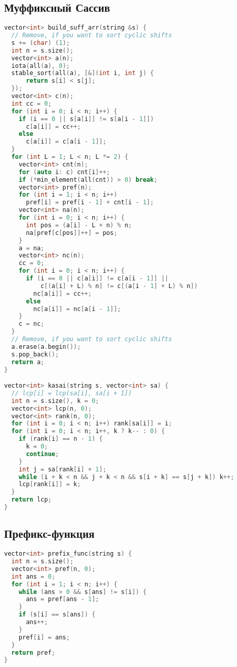 \documentclass[9pt,a4paper,landscape,twosided]{extarticle}
\begin{document}
\begin{multicols*}{3}
\subsection{Муффиксный Сассив}
\begin{lstlisting}[language=C++]
vector<int> build_suff_arr(string &s) {
  // Remove, if you want to sort cyclic shifts
  s += (char) (1);
  int n = s.size();
  vector<int> a(n);
  iota(all(a), 0);
  stable_sort(all(a), [&](int i, int j) {
      return s[i] < s[j];
  });
  vector<int> c(n);
  int cc = 0;
  for (int i = 0; i < n; i++) {
    if (i == 0 || s[a[i]] != s[a[i - 1]])
      c[a[i]] = cc++;
    else
      c[a[i]] = c[a[i - 1]];
  }
  for (int L = 1; L < n; L *= 2) {
    vector<int> cnt(n);
    for (auto i: c) cnt[i]++;
    if (*min_element(all(cnt)) > 0) break;
    vector<int> pref(n);
    for (int i = 1; i < n; i++)
      pref[i] = pref[i - 1] + cnt[i - 1];
    vector<int> na(n);
    for (int i = 0; i < n; i++) {
      int pos = (a[i] - L + n) % n;
      na[pref[c[pos]]++] = pos;
    }
    a = na;
    vector<int> nc(n);
    cc = 0;
    for (int i = 0; i < n; i++) {
      if (i == 0 || c[a[i]] != c[a[i - 1]] ||
          c[(a[i] + L) % n] != c[(a[i - 1] + L) % n])
        nc[a[i]] = cc++;
      else
        nc[a[i]] = nc[a[i - 1]];
    }
    c = nc;
  }
  // Remove, if you want to sort cyclic shifts
  a.erase(a.begin());
  s.pop_back();
  return a;
}

vector<int> kasai(string s, vector<int> sa) {
  // lcp[i] = lcp(sa[i], sa[i + 1])
  int n = s.size(), k = 0;
  vector<int> lcp(n, 0);
  vector<int> rank(n, 0);
  for (int i = 0; i < n; i++) rank[sa[i]] = i;
  for (int i = 0; i < n; i++, k ? k-- : 0) {
    if (rank[i] == n - 1) {
      k = 0;
      continue;
    }
    int j = sa[rank[i] + 1];
    while (i + k < n && j + k < n && s[i + k] == s[j + k]) k++;
    lcp[rank[i]] = k;
  }
  return lcp;
}
\end{lstlisting}

\subsection{Префикс-функция}
\begin{lstlisting}[language=C++]
vector<int> prefix_func(string s) {
  int n = s.size();
  vector<int> pref(n, 0);
  int ans = 0;
  for (int i = 1; i < n; i++) {
    while (ans > 0 && s[ans] != s[i]) {
      ans = pref[ans - 1];
    }
    if (s[i] == s[ans]) {
      ans++;
    }
    pref[i] = ans;
  }
  return pref;
}
\end{lstlisting}


\end{multicols*}
\end{document}
